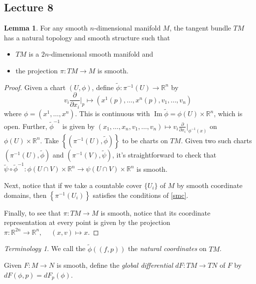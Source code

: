 \documentclass[10pt,letterpaper,cm]{nupset}
\theoremstyle{definition}
\theoremstyle{theorem}
\newtheorem{lemma}[definition]{Lemma}
\theoremstyle{remark}
\newtheorem*{term}{Terminology}
\DeclareMathOperator{\Ima}{Im}
\newcommand{\R}{\mathbb R}
\newcommand{\1}{\mathbf{1}}
\newcommand{\0}{\vec 0}
\begin{document}
\subsection{Lecture 8}

\begin{lemma}
For any smooth $n$-dimensional manifold $M$, the tangent bundle $TM$ has a natural topology and smooth structure such that 
\begin{itemize}
\item $TM$ is a $2n$-dimensional smooth manifold and 
\item the projection $\pi : TM \to M$ is smooth.
\end{itemize}
\end{lemma}
\begin{proof}
Given a chart $(U, \phi)$, define $\tilde{\phi}: \pi^{-1}(U) \to \R^n$ by $$v_i\frac{\partial}{\partial{x_i}}\bigr\rvert_p \mapsto \left(x^1(p), \ldots, x^n(p), v_1, \ldots, v_n\right)$$ where $\phi = (x^1, \ldots, x^n)$. 
This is continuous with $\Ima \tilde{\phi} = \phi(U) \times \R^n$, which is open. Further, $\tilde{\phi}^{-1}$ is given by $\left(x_1, \ldots, x_n, v_1, \ldots, v_n\right)\mapsto v_i \frac{\partial}{\partial{x_i}}\bigr\rvert_{\phi^{-1}(x)}$ on  $\phi(U) \times \R^n$. Take $\left\{\left(\pi^{-1}(U), \tilde{\phi}\right)\right\}$ to be charts on $TM$. Given two such charts $\left(\pi^{-1}(U), \tilde{\phi}\right)$ and $\left(\pi^{-1}(V), \tilde{\psi}\right)$, it's straightforward to check that $\tilde{\psi} \circ \tilde{\phi}^{-1}: \phi(U \cap V)\times \R^n \to \psi(U \cap V)\times \R^n$ is smooth.

\medskip


Next, notice that if we take a countable cover $\{U_i\}$ of $M$ by smooth coordinate domains, then $\left\{\pi^{-1}(U_i)\right\}$ satisfies the conditions of \cref{smc}.

\medskip


Finally, to see that $\pi : TM \to M$ is smooth, notice that its coordinate representation at every point is given by the projection $\pi:\R^{2n} \to \R^n, \ \quad (x,v) \mapsto x$.
\end{proof}

\begin{term}
We call the $\tilde{\phi}\left((f, p)\right)$ the \textit{natural coordinates} on $TM$.
\end{term}

\medskip

Given $F: M \to N$ is smooth, define the \textit{global differential} $dF: TM \to TN$ of $F$ by $dF(\phi, p) = dF_p(\phi)$.
\end{document}
